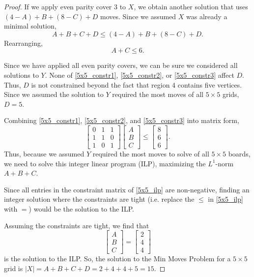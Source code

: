 \documentclass[a4paper]{article}
\newcommand{\abs}[1]{\left| #1 \right|}
\begin{document}
\begin{proof}
		If we apply even parity cover 3 to $X$, we obtain another solution that uses $(4 - A) + B + (8 - C) + D$ moves.
		Since we assumed $X$ was already a minimal solution,
		\begin{equation*}
			A + B + C + D \leq (4 - A) + B + (8 - C) + D.
		\end{equation*}
		Rearranging,
		\begin{equation}\label{5x5_constr3}
			A + C \leq 6.
		\end{equation}
	
		Since we have applied all even parity covers, we can be sure we considered all solutions to $Y$.
		None of \eqref{5x5_constr1}, \eqref{5x5_constr2}, or \eqref{5x5_constr3} affect $D$.
		Thus, $D$ is not constrained beyond the fact that region 4 contains five vertices.
		Since we assumed the solution to $Y$ required the most moves of all $5 \times 5$ grids, $D = 5$.
	
		Combining \eqref{5x5_constr1}, \eqref{5x5_constr2}, and \eqref{5x5_constr3} into matrix form,
		\begin{equation}\label{5x5_ilp}
			\begin{bmatrix}
				0 & 1 & 1 \\
				1 & 1 & 0 \\
				1 & 0 & 1
			\end{bmatrix}
			\begin{bmatrix}
				A \\
				B \\
				C
			\end{bmatrix}
			\leq
			\begin{bmatrix}
				8 \\
				6 \\
				6
			\end{bmatrix}.
		\end{equation}
		Thus, because we assumed $Y$ required the most moves to solve of all $5 \times 5$ boards, we need to solve this integer linear program (ILP), maximizing the $L^1$-norm $A + B + C$.
		
		Since all entries in the constraint matrix of \eqref{5x5_ilp} are non-negative, finding an integer solution where the constraints are tight (i.e. replace the $\leq$ in \eqref{5x5_ilp} with $=$) would be the solution to the ILP.
		
		Assuming the constraints are tight, we find that
		\begin{equation*}
			\begin{bmatrix}
				A \\
				B \\
				C
			\end{bmatrix}
			=
			\begin{bmatrix}
				2 \\
				4 \\
				4
			\end{bmatrix}
		\end{equation*}
		is the solution to the ILP.
		So, the solution to the Min Moves Problem for a $5 \times 5$ grid is $\abs{X} = A + B + C + D = 2 + 4 + 4 + 5 = 15$.
	\end{proof}
\end{document}
